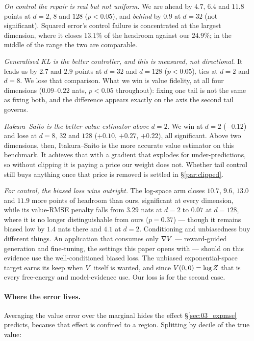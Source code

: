 \emph{On control the repair is real but not uniform.} We are ahead by $4.7$,
$6.4$ and $11.8$ points at $d=2$, $8$ and $128$ ($p<0.05$), and \emph{behind}
by $0.9$ at $d=32$ (not significant). Squared error's control failure is
concentrated at the largest dimension, where it closes $13.1\%$ of the headroom
against our $24.9\%$; in the middle of the range the two are comparable.

\emph{Generalised KL is the better controller, and this is measured, not
directional.} It leads us by $2.7$ and $2.9$ points at $d=32$ and $d=128$
($p<0.05$), ties at $d=2$ and $d=8$. We lose that comparison. What we win is
value fidelity, at all four dimensions ($0.09$--$0.22$ nats, $p<0.05$
throughout): fixing one tail is not the same as fixing both, and the difference
appears exactly on the axis the second tail governs.

\emph{Itakura--Saito is the better value estimator above $d=2$.} We win at
$d=2$ ($-0.12$) and lose at $d=8$, $32$ and $128$ ($+0.10$, $+0.27$, $+0.22$),
all significant. Above two dimensions, then, Itakura--Saito is the more accurate value
estimator on this benchmark. It achieves that with a
gradient that explodes for under-predictions, so without clipping it is paying
a price our weight does not. Whether tail control still buys anything once that
price is removed is settled in \S\ref{par:clipped}.

\emph{For control, the biased loss wins outright.} The log-space arm closes
$10.7$, $9.6$, $13.0$ and $11.9$ more points of headroom than ours, significant
at every dimension, while its value-RMSE penalty falls from $3.29$ nats at
$d=2$ to $0.07$ at $d=128$, where it is no longer distinguishable from ours
($p=0.37$) --- though it remains biased low by $1.4$ nats there and $4.1$ at
$d=2$. Conditioning and unbiasedness buy different things. An application that
consumes only $\nabla V$ --- reward-guided generation and fine-tuning, the
settings this paper opens with --- should on this evidence use the
well-conditioned biased loss. The unbiased exponential-space target earns its
keep when $V$ itself is wanted, and since $V(0,0)=\log Z$ that is every
free-energy and model-evidence use. Our loss is for the second case.

\paragraph{Where the error lives.}
Averaging the value error over the marginal hides the effect
\S\ref{sec:03_expmse} predicts, because that effect is confined to a region.
Splitting by decile of the true value:


